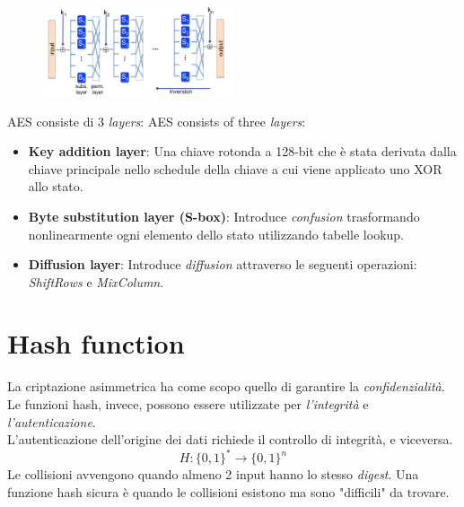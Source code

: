 \documentclass[a4paper,12pt]{article}
\begin{document}
\begin{figure}[H]
  \centering
  \includegraphics[width=0.5\textwidth]{img/aes}
\end{figure}
AES consiste di 3 \textit{layers}:
AES consists of three \textit{layers}:
\begin{itemize}
	\item \textbf{Key addition layer}: Una chiave rotonda a 128-bit che è stata derivata dalla chiave principale nello schedule della chiave a cui viene applicato uno XOR allo stato.
	\item \textbf{Byte substitution layer (S-box)}: Introduce \textit{confusion} trasformando nonlinearmente ogni elemento dello stato utilizzando tabelle lookup.
	\item \textbf{Diffusion layer}: Introduce \textit{diffusion} attraverso le seguenti operazioni: \textit{ShiftRows} e \textit{MixColumn}.
\end{itemize}

\newpage

\section{Hash function}
La criptazione asimmetrica ha come scopo quello di garantire la \textit{confidenzialità}. \\
Le funzioni hash, invece, possono essere utilizzate per \textit{l'integrità} e \textit{l'autenticazione}. \\
L'autenticazione dell'origine dei dati richiede il controllo di integrità, e viceversa.
$$ H : \{0,1\}^* \rightarrow \{0,1\}^n $$
Le collisioni avvengono quando almeno 2 input hanno lo stesso \textit{digest}.
Una funzione hash sicura è quando le collisioni esistono ma sono "difficili" da trovare.
\end{document}
